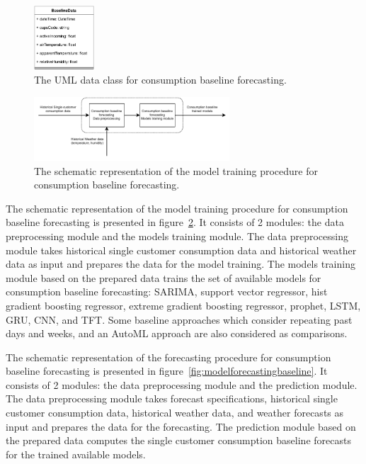 \begin{figure}[H]
\centering
\includegraphics[width=0.20\textwidth]{images/baseline_uml}
\caption{The UML data class for consumption baseline forecasting.}
\label{fig:umlbaseline}
\end{figure}

\begin{figure}[H]
\centering
\includegraphics[width=0.65\textwidth]{images/system_model_training_baseline}
\caption{The schematic representation of the model training procedure for consumption baseline forecasting.}
\label{fig:modeltrainingbaseline}
\end{figure}

The schematic representation of the model training procedure for consumption baseline forecasting is presented in figure~\ref{fig:modeltrainingbaseline}.
It consists of 2 modules: the data preprocessing module and the models training module.
The data preprocessing module takes historical single customer consumption data and historical weather data as input and prepares the data for the model training.
The models training module based on the prepared data trains the set of available models for consumption baseline forecasting: SARIMA, support vector regressor, hist gradient boosting regressor, extreme gradient boosting regressor, prophet, LSTM, GRU, CNN, and TFT.
Some baseline approaches which consider repeating past days and weeks, and an AutoML approach are also considered as comparisons.

The schematic representation of the forecasting procedure for consumption baseline forecasting is presented in figure~\ref{fig:modelforecastingbaseline}.
It consists of 2 modules: the data preprocessing module and the prediction module.
The data preprocessing module takes forecast specifications, historical single customer consumption data, historical weather data, and weather forecasts as input and prepares the data for the forecasting.
The prediction module based on the prepared data computes the single customer consumption baseline forecasts for the trained available models.

